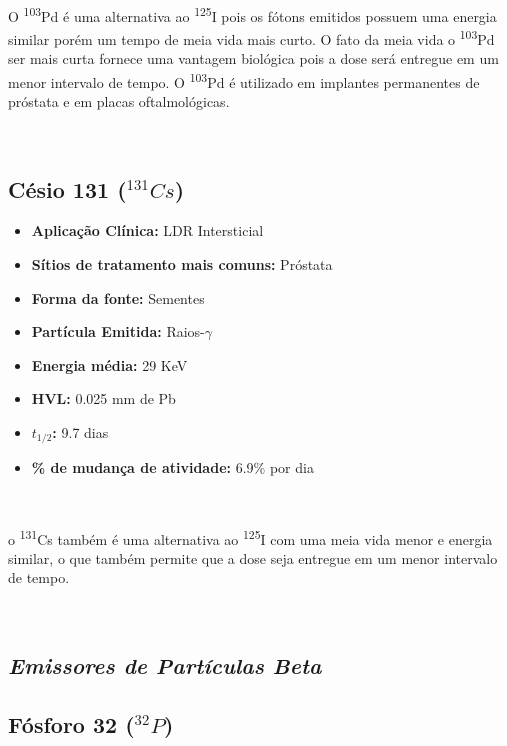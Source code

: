 \documentclass[11pt,a4paper]{article}
\begin{document}
			\

			O \textsuperscript{103}Pd é uma alternativa ao \textsuperscript{125}I pois os fótons emitidos possuem uma energia similar porém um tempo de meia vida mais curto. O fato da meia vida o \textsuperscript{103}Pd ser mais curta fornece uma vantagem biológica pois a dose será entregue em um menor intervalo de tempo. O \textsuperscript{103}Pd é utilizado em implantes permanentes de próstata e em placas oftalmológicas.

			\

		
		\subsection{Césio 131 \textbf{\textcolor{CarnationPink}{(${}^{131}Cs$)}}}

			\begin{itemize}
				\item \textbf{Aplicação Clínica:} LDR Intersticial
				\item \textbf{Sítios de tratamento mais comuns:} Próstata
				\item \textbf{Forma da fonte:} Sementes
				\item \textbf{Partícula Emitida:} Raios-$\gamma$
				\item \textbf{Energia média: } 29 KeV
				\item \textbf{HVL:} 0.025 mm de Pb
				\item \textbf{$t_{1/2}$:} 9.7 dias
				\item \textbf{\% de mudança de atividade: } 6.9\% por dia
			\end{itemize}

			\

			o \textsuperscript{131}Cs também é uma alternativa ao \textsuperscript{125}I com uma meia vida menor e energia similar, o que também permite que a dose seja entregue em um menor intervalo de tempo.

			\

		\subsection*{\textbf{\textit{\textcolor{CarnationPink}{Emissores de Partículas Beta}}}}


		\subsection{Fósforo 32 \textbf{\textcolor{CarnationPink}{(${}^{32}P$)}}}
\end{document}
